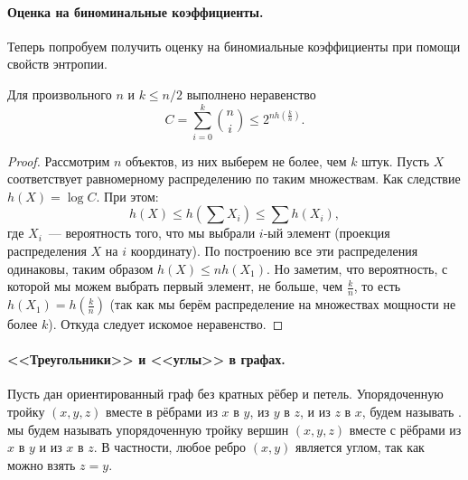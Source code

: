 \paragraph{Оценка на биноминальные коэффициенты.}
Теперь попробуем получить оценку на биномиальные коэффициенты при помощи свойств энтропии.

\begin{proposition}
	Для произвольного $n$ и $k \le n / 2$ выполнено неравенство
    $$
        C = \sum_{i = 0}^k \binom{n}{i} \le 2^{nh\left(\frac{k}{n}\right)}.
    $$
\end{proposition}

\begin{proof}
    Рассмотрим $n$ объектов, из них выберем не более, чем $k$ штук. Пусть $X$ соответствует равномерному
    распределению по таким множествам. Как следствие $h(X) = \log C$. При этом:
    $$
        h(X) \le h\left(\sum X_i\right) \le \sum h(X_i),
    $$
    где $X_i$~--- вероятность того, что мы выбрали $i$-ый элемент (проекция распределения $X$ на $i$
    координату). По построению все эти распределения одинаковы, таким образом $h(X) \le nh(X_1)$. Но
    заметим, что вероятность, с которой мы можем выбрать первый элемент, не больше, чем $\frac{k}{n}$, то
    есть $h(X_1) = h\left(\frac{k}{n}\right)$ (так как мы берём распределение на множествах мощности не
    более $k$). Откуда следует искомое неравенство.
\end{proof}


\paragraph{<<Треугольники>> и <<углы>> в графах.}
Пусть дан ориентированный граф без кратных рёбер и петель. Упорядоченную тройку $(x, y, z)$ вместе в
рёбрами из $x$ в $y$, из $y$ в $z$, и из $z$ в $x$, будем называть
.  мы будем называть упорядоченную тройку вершин $(x, y, z)$ вместе
с рёбрами из $x$ в $y$ и из $x$ в $z$. В частности, любое ребро $(x, y)$ является углом, так как можно
взять $z = y$.

